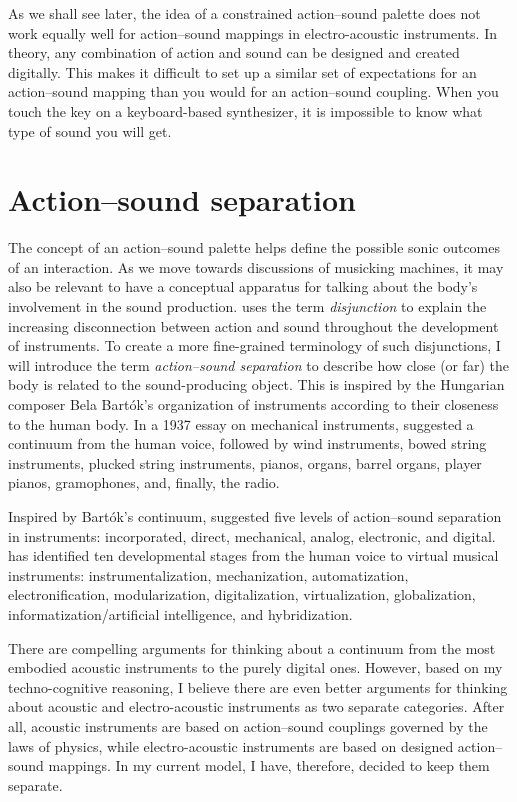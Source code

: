 As we shall see later, the idea of a constrained action--sound palette does not work equally well for action--sound mappings in electro-acoustic instruments. In theory, any combination of action and sound can be designed and created digitally. This makes it difficult to set up a similar set of expectations for an action--sound mapping than you would for an action--sound coupling. When you touch the key on a keyboard-based synthesizer, it is impossible to know what type of sound you will get.


\section{Action--sound separation}\label{sec:separation}

The concept of an action--sound palette helps define the possible sonic outcomes of an interaction. As we move towards discussions of musicking machines, it may also be relevant to have a conceptual apparatus for talking about the body's involvement in the sound production.
\citet{keislar_historical_2009} uses the term \emph{disjunction} to explain the increasing disconnection between action and sound throughout the development of instruments. To create a more fine-grained terminology of such disjunctions, I will introduce the term \emph{action--sound separation} to describe how close (or far) the body is related to the sound-producing object. This is inspired by the Hungarian composer Bela Bartók's organization of instruments according to their closeness to the human body. In a 1937 essay on mechanical instruments, \citet[p.289--290]{bartok_mechanical_1976} suggested a continuum from the human voice, followed by wind instruments, bowed string instruments, plucked string instruments, pianos, organs, barrel organs, player pianos, gramophones, and, finally, the radio.

Inspired by Bartók's continuum, \citet{thelle_making_2010} suggested five levels of action--sound separation in instruments: incorporated, direct, mechanical, analog, electronic, and digital.
\citet{enders_idiophone_2017} has identified ten developmental stages from the human voice to virtual musical instruments: instrumentalization, mechanization, automatization, electronification, modularization, digitalization, virtualization, globalization, informatization/artificial intelligence, and hybridization.

There are compelling arguments for thinking about a continuum from the most embodied acoustic instruments to the purely digital ones. However, based on my techno-cognitive reasoning, I believe there are even better arguments for thinking about acoustic and electro-acoustic instruments as two separate categories. After all, acoustic instruments are based on action--sound couplings governed by the laws of physics, while electro-acoustic instruments are based on designed action--sound mappings. In my current model, I have, therefore, decided to keep them separate.

